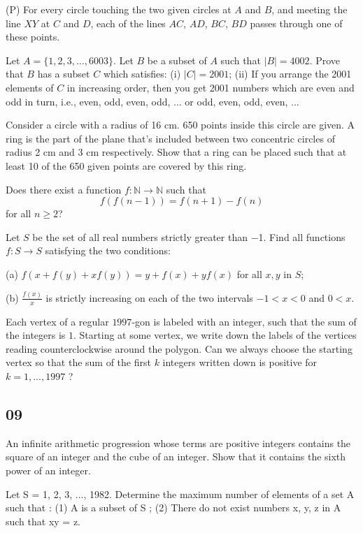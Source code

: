 (P) For every circle touching the two given circles at $ A$ and $ B$, and meeting the line $ XY$ at $ C$ and $ D$, each of the lines $ AC$, $ AD$, $ BC$, $ BD$ passes through one of these points.
\eq

\bq{}{}
Let $A = \{1, 2, 3, \ldots, 6003\}$. Let $B$ be a subset of $A$ such that $|B| = 4002$. Prove that $B$ has a subset $C$ which satisfies:
(i) $|C| = 2001$;
(ii) If you arrange the 2001 elements of $C$ in increasing order, then you get 2001 numbers which are even and odd in turn, i.e., even, odd, even, odd, ... or odd, even, odd, even, ...
\eq

\bq{}{}
Consider a circle with a radius of 16 cm. 650 points inside this circle are given.
A ring is the part of the plane that's included between two concentric circles of radius 2 cm and 3 cm respectively.
Show that a ring can be placed such that at least 10 of the 650 given points are covered by this ring.
\eq

\bq{}{}
Does there exist a function $f:\mathbb N\to\mathbb N$ such that
\[f(f(n-1)) = f(n+1) -f(n) \] for all $n \geq 2$?
\eq

Let $ S$ be the set of all real numbers strictly greater than −1. Find all functions $ f: S \to S$ satisfying the two conditions:

(a) $ f(x + f(y) + xf(y)) = y + f(x) + yf(x)$ for all $ x, y$ in $ S$;

(b) $ \frac {f(x)}{x}$ is strictly increasing on each of the two intervals $ - 1 < x < 0$ and $ 0 < x$.
\eq

\bq{}{}
Each vertex of a regular $1997$-gon is labeled with an integer, such that the sum of the integers is $1$. Starting at some vertex, we write down the labels of the vertices reading counterclockwise around the polygon.
Can we always choose the starting vertex so that the sum of the first $k$ integers written down is positive for $k =1,...,1997$ ?
\eq

\newpage
\subsection{09}
\bq{}{}
An infinite arithmetic progression whose terms are positive integers contains the square of an integer and the cube of an integer. Show that it contains the sixth power of an integer.
\eq

\bq{}{}
Let S = {1, 2, 3, ..., 1982}.
Determine the maximum number of elements of a set A such that :
(1) A is a subset of S ;
(2) There do not exist numbers x, y, z in A such that xy = z.
\eq

